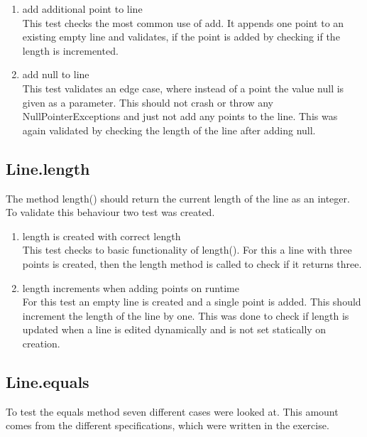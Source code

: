 \begin{enumerate}
    \item add additional point to line \\
    This test checks the most common use of add. It appends one point to an existing empty line and validates, if the point is added by checking if the length is incremented. 
    \item add null to line \\
    This test validates an edge case, where instead of a point the value null is given as a parameter. This should not crash or throw any NullPointerExceptions and just not add any points to the line. This was again validated by checking the length of the line after adding null.
\end{enumerate}

\subsection{Line.length}
The method length() should return the current length of the line as an integer. To validate this behaviour two test was created.

\begin{enumerate}
    \item length is created with correct length \\
    This test checks to basic functionality of length(). For this a line with three points is created, then the length method is called to check if it returns three.
    \item length increments when adding points on runtime \\
    For this test an empty line is created and a single point is added. This should increment the length of the line by one. This was done to check if length is updated when a line is edited dynamically and is not set statically on creation.
\end{enumerate}

\subsection{Line.equals}
\label{sec:line_equals}
To test the equals method seven different cases were looked at. This amount comes from the different specifications, which were written in the exercise.

